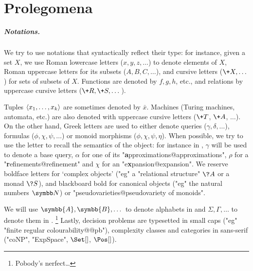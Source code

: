 \chapter{Prolegomena}
\label{ch:general-preliminaries}
\renewcommand\thefigure{\thechapter.\arabic{figure}}

\begin{chapterpresentation}
	\begin{abstract}
		We introduce the basic definitions and notations used throughout this thesis.
		Rather than reading it linearly, we recommand to skim it
		to get an idea of what it contains, and to only go back to this chapter
		only when needed, using the numerous internal hyperlinks.
	\end{abstract}
		
	\par\bigskip\bigskip
	\chaptertoc
\end{chapterpresentation}

\paragraph*{Notations.}
We try to use notations that syntactically reflect their type:
for instance, given a set $X$, we use Roman lowercase letters ($x,y,z,\dotsc$)
to denote elements of $X$, Roman uppercase letters for its subsets ($A, B, C, \dotsc$),
and cursive letters ($\+X, \dotsc$) for sets of subsets of $X$.
Functions are denoted by $f, g, h$, etc., and relations by
uppercase cursive letters ($\+R, \+S, \dotsc$).

Tuples $\langle x_1,\dotsc,x_k\rangle$ are sometimes denoted by $\bar x$.
Machines (Turing machines, automata, etc.) are also denoted
with uppercase cursive letters ($\+T$, $\+A$, $\dotsc$).
On the other hand, Greek letters are used to either denote queries ($\gamma, \delta, \dotsc$),
formulas ($\phi, \chi, \psi, \dotsc$) or monoid morphisms ($\phi, \chi, \psi, \eta$). When possible, we try to
use the letter to recall the semantics of the object: for instance in
, $\gamma$ will be used to denote a base query,
$\alpha$ for one of its "\textbf{a}pproximations@approximations",
$\rho$ for a "\textbf{r}efinements@refinement" and
$\chi$ for an "e\textbf{x}pansion@expansion".
We reserve boldface letters for `complex objects' ("eg"
a "relational structure" $\?A$ or a monad $\?S$), and blackboard bold
for canonical objects ("eg" the natural numbers $\N$) or "pseudovarieties@pseudovariety of monoids".

We will use $\symbb{A}, \symbb{B}, \dotsc$ to denote
alphabets in  and $\Sigma, \Gamma, \dotsc$
to denote them in .%
\footnote{Pobody's nerfect…}
Lastly, decision problems are typesetted in small caps
("eg" "finite regular colourability@@pb"), 
complexity classes and categories in sans-serif ("coNP", "ExpSpace", $\Set[]$,
$\Pos[]$).


